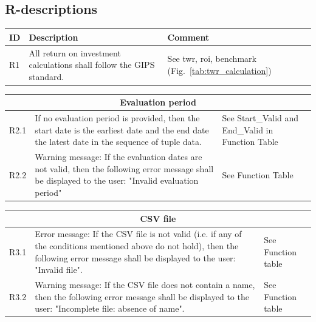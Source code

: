 \documentclass[runningheads,12pt]{article}
\begin{document}
\subsection{R-descriptions}

{\centering
\begin{longtable}{|l|p{9cm}|p{5cm}|}
\hline
\textbf{ID} & \textbf{Description} & \textbf{Comment}\\

\hline
R1 & All return on investment calculations shall follow the GIPS standard. & See twr, roi, benchmark (Fig.~\ref{tab:twr_calculation}) \\

\hline
\end{longtable}
\centering
\begin{longtable}{|l|p{9cm}|p{5cm}|}
\hline
\multicolumn{3}{|c|}{\textbf{Evaluation period}} \\

\hline
R2.1 & If no evaluation period is provided, then the start date is the earliest date and the end date the latest date in the sequence of tuple data. & See Start\_Valid and End\_Valid in Function Table\\

\hline
R2.2 &  Warning message: If the evaluation dates are not valid, then the following error message shall be displayed to the user: "Invalid evaluation period" & See Function Table \\

\hline
\end{longtable}
\centering
\begin{longtable}{|l|p{9cm}|p{5cm}|}

\hline
\multicolumn{3}{|c|}{\textbf{CSV file}} \\

\hline
R3.1 &  Error message: If the CSV file is not valid (i.e. if any of the conditions mentioned above do not hold), then the following error message shall be displayed to the user: "Invalid file". & See Function table\\

\hline
R3.2 &  Warning message: If the CSV file does not contain a name, then the following error message shall be displayed to the user: "Incomplete file: absence of name". & See Function table\\

\hline
\end{longtable}
\centering
\begin{longtable}{|l|p{9cm}|p{5cm}|}


\end{longtable}}
\end{document}
